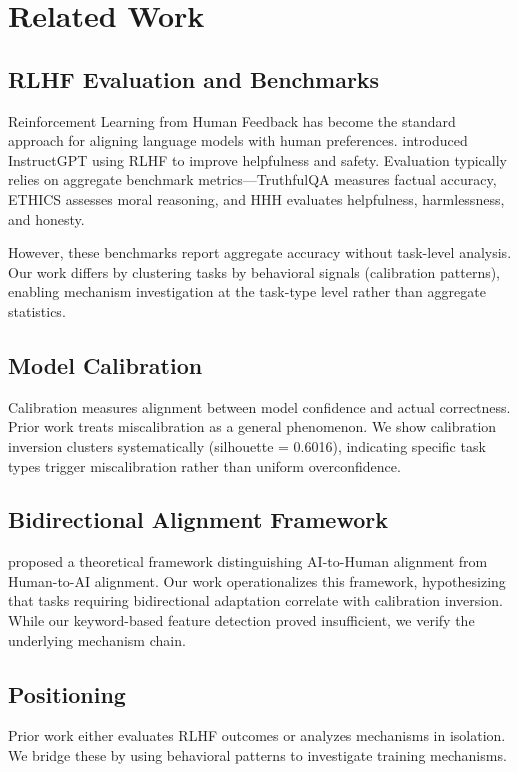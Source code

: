 \section{Related Work}

\subsection{RLHF Evaluation and Benchmarks}

Reinforcement Learning from Human Feedback has become the standard approach for aligning language models with human preferences. \citet{ouyang2022training} introduced InstructGPT using RLHF to improve helpfulness and safety. Evaluation typically relies on aggregate benchmark metrics---TruthfulQA measures factual accuracy, ETHICS assesses moral reasoning, and HHH evaluates helpfulness, harmlessness, and honesty.

However, these benchmarks report aggregate accuracy without task-level analysis. Our work differs by clustering tasks by behavioral signals (calibration patterns), enabling mechanism investigation at the task-type level rather than aggregate statistics.

\subsection{Model Calibration}

Calibration measures alignment between model confidence and actual correctness. Prior work treats miscalibration as a general phenomenon. We show calibration inversion clusters systematically (silhouette = 0.6016), indicating specific task types trigger miscalibration rather than uniform overconfidence.

\subsection{Bidirectional Alignment Framework}

\citet{shen2024bidirectional} proposed a theoretical framework distinguishing AI-to-Human alignment from Human-to-AI alignment. Our work operationalizes this framework, hypothesizing that tasks requiring bidirectional adaptation correlate with calibration inversion. While our keyword-based feature detection proved insufficient, we verify the underlying mechanism chain.

\subsection{Positioning}

Prior work either evaluates RLHF outcomes or analyzes mechanisms in isolation. We bridge these by using behavioral patterns to investigate training mechanisms.
